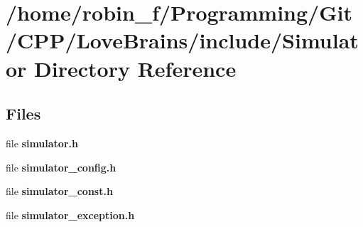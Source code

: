 \section{/home/robin\+\_\+f/\+Programming/\+Git/\+C\+P\+P/\+Love\+Brains/include/\+Simulator Directory Reference}
\label{dir_75464f83a3f1c0c7a2803ef145c19747}
\subsection*{Files}
\begin{DoxyCompactItemize}
\item 
file {\bfseries simulator.\+h}
\item 
file {\bfseries simulator\+\_\+config.\+h}
\item 
file {\bfseries simulator\+\_\+const.\+h}
\item 
file {\bfseries simulator\+\_\+exception.\+h}
\end{DoxyCompactItemize}
